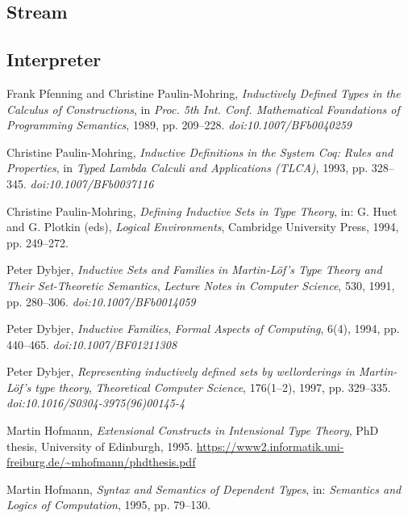 \documentclass{article}
\begin{document}
\subsection{Stream}

\subsection{Interpreter}

\newpage
\begin{thebibliography}{99}


Frank Pfenning and Christine Paulin-Mohring,
\textit{Inductively Defined Types in the Calculus of Constructions},
in \textit{Proc. 5th Int. Conf. Mathematical Foundations of Programming Semantics}, 1989, pp. 209–228.
\textit{doi:10.1007/BFb0040259}

Christine Paulin-Mohring,
\textit{Inductive Definitions in the System Coq: Rules and Properties},
in \textit{Typed Lambda Calculi and Applications (TLCA)}, 1993, pp. 328–345.
\textit{doi:10.1007/BFb0037116}

Christine Paulin-Mohring,
\textit{Defining Inductive Sets in Type Theory},
in: G. Huet and G. Plotkin (eds), \textit{Logical Environments}, Cambridge University Press, 1994, pp. 249–272.

Peter Dybjer,
\textit{Inductive Sets and Families in Martin-Löf's Type Theory and Their Set-Theoretic Semantics},
\textit{Lecture Notes in Computer Science}, 530, 1991, pp. 280–306.
\textit{doi:10.1007/BFb0014059}

Peter Dybjer,
\textit{Inductive Families},
\textit{Formal Aspects of Computing}, 6(4), 1994, pp. 440–465.
\textit{doi:10.1007/BF01211308}

Peter Dybjer,
\textit{Representing inductively defined sets by wellorderings in Martin-Löf’s type theory},
\textit{Theoretical Computer Science}, 176(1–2), 1997, pp. 329–335.
\textit{doi:10.1016/S0304-3975(96)00145-4}

Martin Hofmann,
\textit{Extensional Constructs in Intensional Type Theory},
PhD thesis, University of Edinburgh, 1995.
\url{https://www2.informatik.uni-freiburg.de/~mhofmann/phdthesis.pdf}

Martin Hofmann,
\textit{Syntax and Semantics of Dependent Types},
in: \textit{Semantics and Logics of Computation}, 1995, pp. 79–130.


\end{thebibliography}
\end{document}
